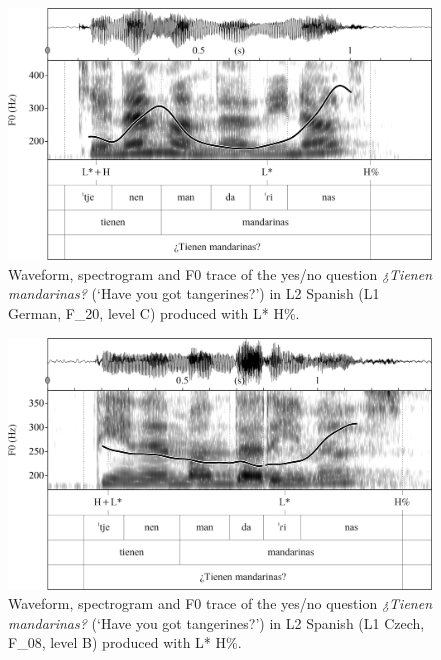 \begin{figure}


\includegraphics[width=\textwidth]{figures/Figure_4.72.png}



\caption{Waveform, spectrogram and F0 trace of the yes/no question \textit{¿Tienen mandarinas?} (‘Have you got tangerines?’) in L2 Spanish (L1 German, F\_20, level C) produced with L* H\%.}
\label{fig:4.72}
\end{figure}

\begin{figure}


\includegraphics[width=\textwidth]{figures/Figure_4.73.png}



\caption{Waveform, spectrogram and F0 trace of the yes/no question \textit{¿Tienen mandarinas?} (‘Have you got tangerines?’) in L2 Spanish (L1 Czech, F\_08, level B) produced with L* H\%.}
\label{fig:4.73}
\end{figure}

